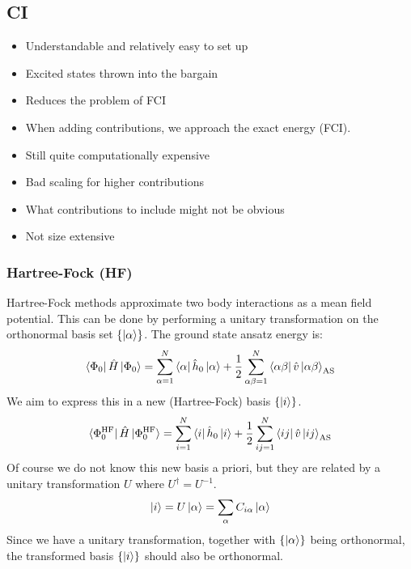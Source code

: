 \documentclass[
11pt,notheorems,hyperref={pdfauthor=whatever}
]{beamer}
\begin{document}
\subsection{CI}
\begin{frame}
    \textcolor{Green}{}
    \begin{itemize}
        \item Understandable and relatively easy to set up 
        \item Excited states thrown into the bargain
        \item Reduces the problem of FCI
        \item When adding contributions, we approach the exact energy (FCI).
    \end{itemize}
    \vspace{20px}
    \textcolor{Red}{}
    \begin{itemize}
        \item Still quite computationally expensive
        \item Bad scaling for higher contributions
        \item What contributions to include might not be obvious
        \item Not size extensive 
    \end{itemize}
\end{frame}

\begin{frame}
    \frametitle{Hartree-Fock (HF)}
    Hartree-Fock methods approximate two body interactions as a mean field potential. This can be done by performing a unitary transformation on the orthonormal basis set $\{ \ket{\alpha} \}$. The ground state ansatz energy is:
    \begin{align*}
        \bra{\Phi_0}\hat{H}\ket{\Phi_0} = \sum_{\alpha=1}^N \bra{\alpha}\hat{h}_0\ket{\alpha} + \frac{1}{2} \sum_{\alpha\beta=1}^N \bra{\alpha\beta}\hat{v}\ket{\alpha\beta}_{\text{AS}} 
    \end{align*}
    We aim to express this in a new (Hartree-Fock) basis $\{ \ket{i} \}$.
    \begin{align*}
        \bra{\Phi^{\text{HF}}_0}\hat{H}\ket{\Phi^{\text{HF}}_0} = \sum_{i=1}^{N} \bra{i}\hat{h}_0\ket{i} + \frac{1}{2}\sum_{ij=1}^{N} \bra{ij}\hat{v}\ket{ij}_{\text{AS}}
    \end{align*}
    Of course we do not know this new basis a priori, but they are related by a unitary transformation $U$ where $U^\dagger = U^{-1}$. 
    \begin{align*}
        \ket{i} = U\ket{\alpha} = \sum_{\alpha} C_{i\alpha} \ket{\alpha}
    \end{align*}
    Since we have a unitary transformation, together with $\{ \ket{\alpha} \}$ being orthonormal, the transformed basis $\{ \ket{i} \}$ should also be orthonormal. 
\end{frame}
\end{document}
